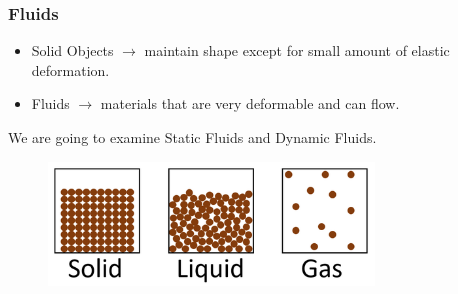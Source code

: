 \documentclass[]{beamer}
\begin{document}
\begin{frame}
  \frametitle{Fluids}
    \begin{itemize}
      \item  Solid Objects $\rightarrow$ maintain shape except for small amount 
      of elastic deformation.
      \item Fluids $\rightarrow$  materials that are very deformable and can flow.
    \end{itemize}

\pause
\vspace*{10mm}

  We are going to examine \textcolor{mypink1}{Static Fluids} and 
  \textcolor{mypink1}{Dynamic Fluids}.



  \begin{figure}[h!]
    \begin{center}
      \includegraphics[height=1.3in]{images2/0b.png}
      \label{0b}
    \end{center}
  \end{figure}
  

  
  \end{frame}

\end{document}
